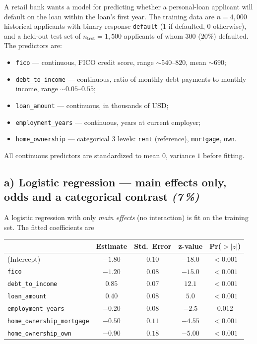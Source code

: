 \documentclass[11pt,a4paper]{article}
\newcommand{\subpoints}[1]{\textit{(#1\,\%)}}
\begin{document}
A retail bank wants a model for predicting whether a personal-loan applicant will default on the loan within the loan's first year. The training data are $n = 4{,}000$ historical applicants with binary response \texttt{default} ($1$ if defaulted, $0$ otherwise), and a held-out test set of $n_\text{test} = 1{,}500$ applicants of whom $300$ ($20\%$) defaulted. The predictors are:
\begin{itemize}
  \item \texttt{fico} --- continuous, FICO credit score, range $\sim 540$--$820$, mean $\sim 690$;
  \item \texttt{debt\_to\_income} --- continuous, ratio of monthly debt payments to monthly income, range $\sim 0.05$--$0.55$;
  \item \texttt{loan\_amount} --- continuous, in thousands of USD;
  \item \texttt{employment\_years} --- continuous, years at current employer;
  \item \texttt{home\_ownership} --- categorical $3$ levels: \texttt{rent} (reference), \texttt{mortgage}, \texttt{own}.
\end{itemize}
All continuous predictors are standardized to mean $0$, variance $1$ before fitting.

\subsection*{a) Logistic regression --- main effects only, odds and a categorical contrast \subpoints{7}}

A logistic regression with only \emph{main effects} (no interaction) is fit on the training set. The fitted coefficients are

\begin{center}\small
\begin{tabular}{lcccc}
\toprule
 & \textbf{Estimate} & \textbf{Std.\ Error} & \textbf{z-value} & \textbf{Pr($>|z|$)} \\
\midrule
(Intercept)                                  & $-1.80$  & $0.10$  & $-18.0$  & $<0.001$ \\
\texttt{fico}                                & $-1.20$  & $0.08$  & $-15.0$  & $<0.001$ \\
\texttt{debt\_to\_income}                    & $0.85$   & $0.07$  & $12.1$   & $<0.001$ \\
\texttt{loan\_amount}                        & $0.40$   & $0.08$  & $5.0$    & $<0.001$ \\
\texttt{employment\_years}                   & $-0.20$  & $0.08$  & $-2.5$   & $0.012$  \\
\texttt{home\_ownership\_mortgage}           & $-0.50$  & $0.11$  & $-4.55$  & $<0.001$ \\
\texttt{home\_ownership\_own}                & $-0.90$  & $0.18$  & $-5.00$  & $<0.001$ \\
\bottomrule
\end{tabular}
\end{center}
\end{document}

